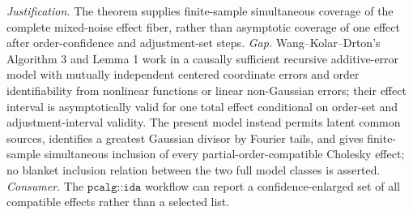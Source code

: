 \documentclass{article}
\begin{document}
\par\smallskip\noindent \textit{Justification.} The theorem supplies finite-sample simultaneous coverage of the complete mixed-noise effect fiber, rather than asymptotic coverage of one effect after order-confidence and adjustment-set steps. \textit{Gap.} Wang--Kolar--Drton's Algorithm 3 and Lemma 1 work in a causally sufficient recursive additive-error model with mutually independent centered coordinate errors and order identifiability from nonlinear functions or linear non-Gaussian errors; their effect interval is asymptotically valid for one total effect conditional on order-set and adjustment-interval validity. The present model instead permits latent common sources, identifies a greatest Gaussian divisor by Fourier tails, and gives finite-sample simultaneous inclusion of every partial-order-compatible Cholesky effect; no blanket inclusion relation between the two full model classes is asserted. \textit{Consumer.} The \(\texttt{pcalg::ida}\) workflow can report a confidence-enlarged set of all compatible effects rather than a selected list.
\end{document}
